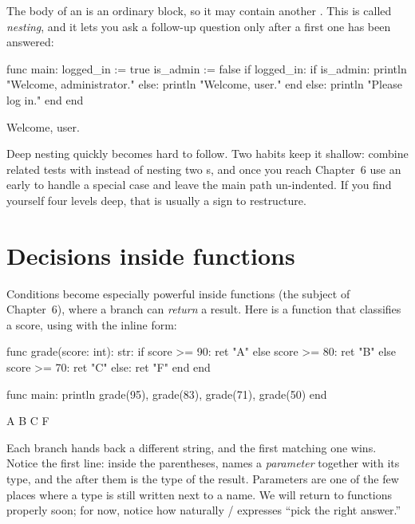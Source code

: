 The body of an  is an ordinary block, so it may contain another
. This is called \emph{nesting}, and it lets you ask a follow-up
question only after a first one has been answered:

\begin{salamen}
func main:
    logged_in := true
    is_admin := false
    if logged_in:
        if is_admin:
            println "Welcome, administrator."
        else:
            println "Welcome, user."
        end
    else:
        println "Please log in."
    end
end
\end{salamen}

\begin{progout}
Welcome, user.
\end{progout}

\begin{tip}
Deep nesting quickly becomes hard to follow. Two habits keep it shallow: combine
related tests with  instead of nesting two s, and once you
reach Chapter~6 use an early  to handle a special case and leave the
main path un-indented. If you find yourself four levels deep, that is usually a
sign to restructure.
\end{tip}

\section{Decisions inside functions}

Conditions become especially powerful inside functions (the subject of
Chapter~6), where a branch can \emph{return} a result. Here is a function that
classifies a score, using  with the inline  form:

\begin{salamen}
func grade(score: int): str:
    if score >= 90: ret "A"
    else score >= 80: ret "B"
    else score >= 70: ret "C"
    else: ret "F"
    end
end

func main:
    println grade(95), grade(83), grade(71), grade(50)
end
\end{salamen}

\begin{progout}
A B C F
\end{progout}

Each branch hands back a different string, and the first matching one wins.
Notice the first line: inside the parentheses,  names a
\emph{parameter} together with its type, and the  after them is the
type of the result. Parameters are one of the few places where a type is still
written next to a name. We will return to functions properly soon; for now, notice how naturally
/ expresses ``pick the right answer.''

